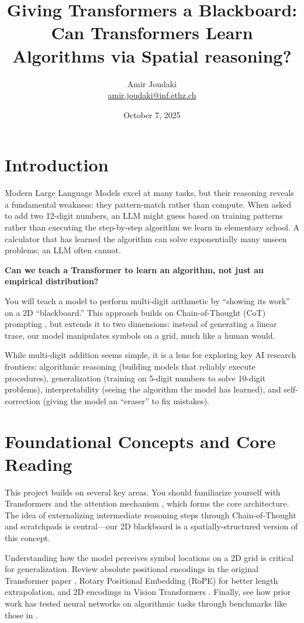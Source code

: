 \documentclass[11pt, a4paper]{article}
\title{Giving Transformers a Blackboard:\\
Can Transformers Learn Algorithms via Spatial reasoning?}
\author{Amir Joudaki \\ \href{mailto:amir.joudaki@inf.ethz.ch}{amir.joudaki@inf.ethz.ch}}
\date{October 7, 2025}
\begin{document}
\maketitle

\section{Introduction}

Modern Large Language Models excel at many tasks, but their reasoning reveals a fundamental weakness: they pattern-match rather than compute. When asked to add two 12-digit numbers, an LLM might guess based on training patterns rather than executing the step-by-step algorithm we learn in elementary school. A calculator that has learned the algorithm can solve exponentially many unseen problems; an LLM often cannot.

\textbf{Can we teach a Transformer to learn an algorithm, not just an empirical distribution?}

You will teach a model to perform multi-digit arithmetic by ``showing its work'' on a 2D ``blackboard.'' This approach builds on Chain-of-Thought (CoT) prompting \citep{wei2022chain}, but extends it to two dimensions: instead of generating a linear trace, our model manipulates symbols on a grid, much like a human would.

While multi-digit addition seems simple, it is a lens for exploring key AI research frontiers: algorithmic reasoning (building models that reliably execute procedures), generalization (training on 5-digit numbers to solve 10-digit problems), interpretability (seeing the algorithm the model has learned), and self-correction (giving the model an ``eraser'' to fix mistakes).

\section{Foundational Concepts and Core Reading}

This project builds on several key areas. You should familiarize yourself with Transformers and the attention mechanism \citep{vaswani2017attention}, which forms the core architecture. The idea of externalizing intermediate reasoning steps through Chain-of-Thought and scratchpads \citep{wei2022chain,nye2021show} is central—our 2D blackboard is a spatially-structured version of this concept.

Understanding how the model perceives symbol locations on a 2D grid is critical for generalization. Review absolute positional encodings in the original Transformer paper \citep{vaswani2017attention}, Rotary Positional Embedding (RoPE) \citep{su2021roformer} for better length extrapolation, and 2D encodings in Vision Transformers \citep{dosovitskiy2020image}. Finally, see how prior work has tested neural networks on algorithmic tasks through benchmarks like those in \citet{saxton2019analysing}.
\end{document}
